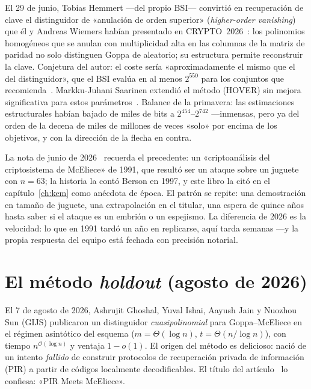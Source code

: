 El 29 de junio, Tobias Hemmert ---del propio BSI--- convirtió en
recuperación de clave el distinguidor de «anulación de orden
superior» (\emph{higher-order vanishing}) que él y Andreas Wiemers
habían presentado en CRYPTO~2026~\cite{hemmert2026,hemmertwiemers2026}:
los polinomios homogéneos que se anulan con multiplicidad alta en
las columnas de la matriz de paridad no solo distinguen Goppa de
aleatorio; su estructura permite reconstruir la clave. Conjetura
del autor: el coste sería «aproximadamente el mismo que el del
distinguidor», que el BSI evalúa en al menos $2^{550}$ para los
conjuntos que recomienda~\cite{bsi2026}. Markku-Juhani Saarinen
extendió el método (HOVER) sin mejora significativa para estos
parámetros~\cite{saarinen2026hover}. Balance de la primavera: las
estimaciones estructurales habían bajado de miles de bits a
$2^{454}$--$2^{742}$ ---inmensas, pero ya del orden de la decena
de miles de millones de veces «solo» por encima de los objetivos,
y con la dirección de la flecha en contra.

\begin{historia}
La nota de junio de 2026~\cite{cm610} recuerda el precedente: un
«criptoanálisis del criptosistema de McEliece» de 1991, que resultó
ser un ataque sobre un juguete con $n=63$; la historia la contó
Berson en 1997, y este libro la citó en el capítulo~\ref{ch:kem}
como anécdota de época. El patrón se repite: una demostración en
tamaño de juguete, una extrapolación en el titular, una espera de
quince años hasta saber si el ataque es un embrión o un espejismo.
La diferencia de 2026 es la velocidad: lo que en 1991 tardó un año
en replicarse, aquí tarda semanas ---y la propia respuesta del
equipo está fechada con precisión notarial.
\end{historia}

\section{El método \emph{holdout} (agosto de 2026)}\label{sec:2026-holdout}

El 7 de agosto de 2026, Ashrujit Ghoshal, Yuval Ishai, Aayush Jain y
Nuozhou Sun (GIJS) publicaron un distinguidor \emph{cuasipolinomial}
para Goppa--McEliece en el régimen asintótico del esquema
($m=\Theta(\log n)$, $t=\Theta(n/\log n)$), con tiempo
$n^{\mathcal{O}(\log n)}$ y ventaja $1-o(1)$. El origen del método
es delicioso: nació de un intento \emph{fallido} de construir
protocolos de recuperación privada de información (PIR) a partir de
códigos localmente decodificables. El título del
artículo~\cite{ghoshal2026} lo confiesa: «PIR Meets McEliece».

